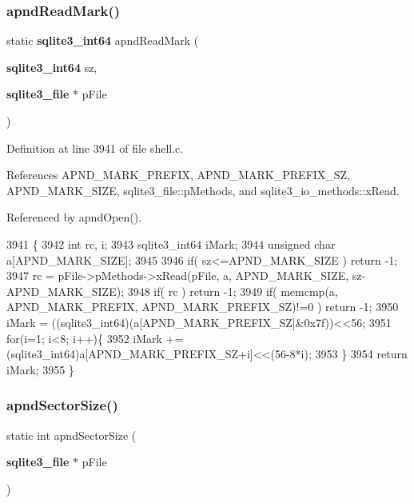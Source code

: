 \subsubsection{apnd\+Read\+Mark()}
{\footnotesize\ttfamily static \textbf{ sqlite3\+\_\+int64} apnd\+Read\+Mark (\begin{DoxyParamCaption}\item[{\textbf{ sqlite3\+\_\+int64}}]{sz,  }\item[{\textbf{ sqlite3\+\_\+file} $\ast$}]{p\+File }\end{DoxyParamCaption})\hspace{0.3cm}{\ttfamily [static]}}



Definition at line 3941 of file shell.\+c.



References A\+P\+N\+D\+\_\+\+M\+A\+R\+K\+\_\+\+P\+R\+E\+F\+IX, A\+P\+N\+D\+\_\+\+M\+A\+R\+K\+\_\+\+P\+R\+E\+F\+I\+X\+\_\+\+SZ, A\+P\+N\+D\+\_\+\+M\+A\+R\+K\+\_\+\+S\+I\+ZE, sqlite3\+\_\+file\+::p\+Methods, and sqlite3\+\_\+io\+\_\+methods\+::x\+Read.



Referenced by apnd\+Open().


\begin{DoxyCode}
3941                                                                         \{
3942   \textcolor{keywordtype}{int} rc, i;
3943   sqlite3_int64 iMark;
3944   \textcolor{keywordtype}{unsigned} \textcolor{keywordtype}{char} a[APND_MARK_SIZE];
3945 
3946   \textcolor{keywordflow}{if}( sz<=APND_MARK_SIZE ) \textcolor{keywordflow}{return} -1;
3947   rc = pFile->pMethods->xRead(pFile, a, APND_MARK_SIZE, sz-APND_MARK_SIZE);
3948   \textcolor{keywordflow}{if}( rc ) \textcolor{keywordflow}{return} -1;
3949   \textcolor{keywordflow}{if}( memcmp(a, APND_MARK_PREFIX, APND_MARK_PREFIX_SZ)!=0 ) \textcolor{keywordflow}{return} -1;
3950   iMark = ((sqlite3_int64)(a[APND_MARK_PREFIX_SZ]&0x7f))<<56;
3951   \textcolor{keywordflow}{for}(i=1; i<8; i++)\{    
3952     iMark += (sqlite3_int64)a[APND_MARK_PREFIX_SZ+i]<<(56-8*i);
3953   \}
3954   \textcolor{keywordflow}{return} iMark;
3955 \}
\end{DoxyCode}
\mbox{\label{shell_8c_a176ba25e6fe049e726c7cf938ce71367}} 
\subsubsection{apnd\+Sector\+Size()}
{\footnotesize\ttfamily static int apnd\+Sector\+Size (\begin{DoxyParamCaption}\item[{\textbf{ sqlite3\+\_\+file} $\ast$}]{p\+File }\end{DoxyParamCaption})\hspace{0.3cm}{\ttfamily [static]}}



